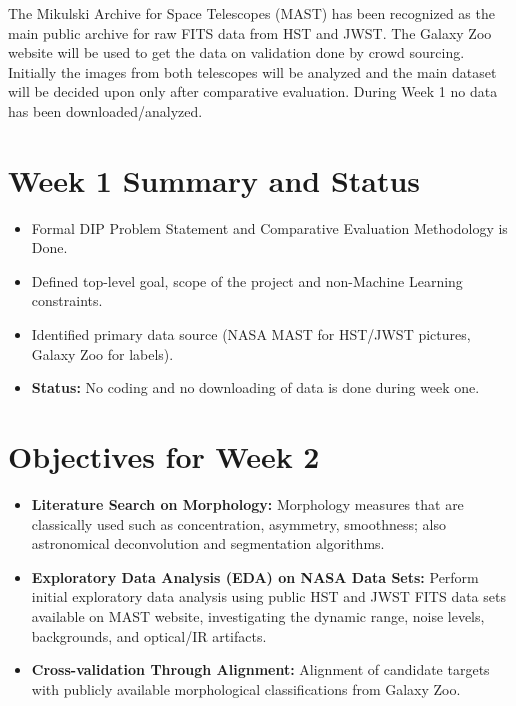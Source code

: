 \documentclass[11pt]{article}
\begin{document}
The Mikulski Archive for Space Telescopes (MAST) has been recognized as the main public archive for raw FITS data from HST and JWST. The Galaxy Zoo website will be used to get the data on validation done by crowd sourcing. Initially the images from both telescopes will be analyzed and the main dataset will be decided upon only after comparative evaluation. During Week 1 no data has been downloaded/analyzed.


\section{Week 1 Summary and Status}

\begin{itemize}
    \item Formal DIP Problem Statement and Comparative Evaluation Methodology is Done.
    \item Defined top-level goal, scope of the project and non-Machine Learning constraints.
    \item Identified primary data source (NASA MAST for HST/JWST pictures, Galaxy Zoo for labels).
    \item \textbf{Status:} No coding and no downloading of data is done during week one.
\end{itemize}


\section{Objectives for Week 2}

\begin{itemize}
    \item \textbf{Literature Search on Morphology:} Morphology measures that are classically used such as concentration, asymmetry, smoothness; also astronomical deconvolution and segmentation algorithms.
    \item \textbf{Exploratory Data Analysis (EDA) on NASA Data Sets:} Perform initial exploratory data analysis using public HST and JWST FITS data sets available on MAST website, investigating the dynamic range, noise levels, backgrounds, and optical/IR artifacts.
    \item \textbf{Cross-validation Through Alignment:} Alignment of candidate targets with publicly available morphological classifications from Galaxy Zoo.
\end{itemize}
\end{document}
